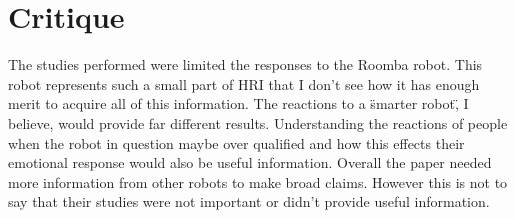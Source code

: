 \documentclass{article}
\begin{document}
\section*{Critique}
The studies performed were limited the responses to the Roomba robot. This robot represents such a small part of HRI that I don't see how it has enough merit to acquire all of this information. The reactions to a \"smarter robot\", I believe, would provide far different results. Understanding the reactions of people when the robot in question maybe over qualified and how this effects their emotional response would also be useful information. Overall the paper needed more information from other robots to make broad claims. However this is not to say that their studies were not important or didn't provide useful information.
\cite{Forlizzi:2006:SRD:1121241.1121286}
\end{document}
